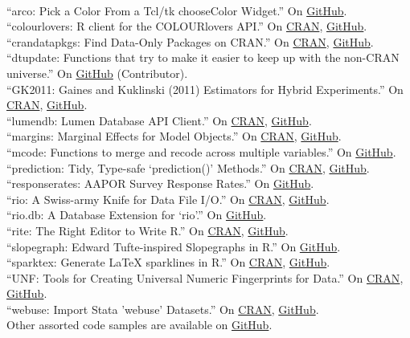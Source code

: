 \documentclass[12pt]{article}
\renewcommand{\section}[1]{\pagebreak[3]%
    \llap{\scshape\smash{\parbox[t]{\marginparwidth}{\raggedright {\color{lg}#1}}}}%
    \vspace{-\baselineskip}\par}
\newcommand{\topic}[1]{\pagebreak[3]\indent {\color{lg}{\footnotesize #1 }}\\}
\newcommand{\entry}[1]{\indent {\color{lg}\guillemotright}\hspace{2pt}#1\vspace{.25em}\\}
\begin{document}
\section{Software}
\topic{R Packages}
	\entry{``arco: Pick a Color From a Tcl/tk chooseColor Widget.'' On \href{https://github.com/leeper/arco}{GitHub}.}
	\entry{``colourlovers: R client for the COLOURlovers API.'' On \href{https://cran.r-project.org/package=colourlovers}{CRAN}, \href{https://github.com/leeper/colourlovers}{GitHub}.}
	\entry{``crandatapkgs: Find Data-Only Packages on CRAN.'' On \href{https://cran.r-project.org/package=crandatapkgs}{CRAN}, \href{https://github.com/leeper/crandatapkgs}{GitHub}.}
	\entry{``dtupdate: Functions that try to make it easier to keep up with the non-CRAN universe.'' On \href{https://github.com/hrbrmstr/dtupdate}{GitHub} (Contributor).}
	\entry{``GK2011: Gaines and Kuklinski (2011) Estimators for Hybrid Experiments.'' On \href{https://cran.r-project.org/package=GK2011}{CRAN}, \href{https://github.com/leeper/GK2011}{GitHub}.}
	\entry{``lumendb: Lumen Database API Client.'' On \href{https://cran.r-project.org/package=lumendb}{CRAN}, \href{https://github.com/leeper/lumendb}{GitHub}.}
	\entry{``margins: Marginal Effects for Model Objects.'' On \href{https://cran.r-project.org/package=margins}{CRAN}, \href{https://github.com/leeper/margins}{GitHub}.}
	\entry{``mcode: Functions to merge and recode across multiple variables.'' On \href{https://github.com/leeper/mcode}{GitHub}.}
	\entry{``prediction: Tidy, Type-safe `prediction()' Methods.'' On \href{https://cran.r-project.org/package=prediction}{CRAN}, \href{https://github.com/leeper/prediction}{GitHub}.}
	\entry{``responserates: AAPOR Survey Response Rates.'' On \href{https://github.com/leeper/responserates}{GitHub}.}
	\entry{``rio: A Swiss-army Knife for Data File I/O.'' On \href{https://cran.r-project.org/package=rio}{CRAN}, \href{https://github.com/leeper/rio}{GitHub}.}
	\entry{``rio.db: A Database Extension for `rio'.'' On \href{https://github.com/leeper/rio.db}{GitHub}.}
	\entry{``rite: The Right Editor to Write R.'' On \href{https://cran.r-project.org/package=rite}{CRAN}, \href{https://github.com/leeper/rio}{GitHub}.}
	\entry{``slopegraph: Edward Tufte-inspired Slopegraphs in R.'' On \href{https://github.com/leeper/slopegraph}{GitHub}.}
	\entry{``sparktex: Generate LaTeX sparklines in R.'' On \href{https://cran.r-project.org/package=sparktex}{CRAN}, \href{https://github.com/leeper/sparktex}{GitHub}.}
	\entry{``UNF: Tools for Creating Universal Numeric Fingerprints for Data.'' On \href{https://cran.r-project.org/package=UNF}{CRAN}, \href{https://github.com/leeper/UNF}{GitHub}.}
	\entry{``webuse: Import Stata 'webuse' Datasets.'' On \href{https://cran.r-project.org/package=webuse}{CRAN}, \href{https://github.com/leeper/webuse}{GitHub}.}
	\entry{Other assorted code samples are available on \href{http://github.com/leeper}{GitHub}.}
\end{document}
